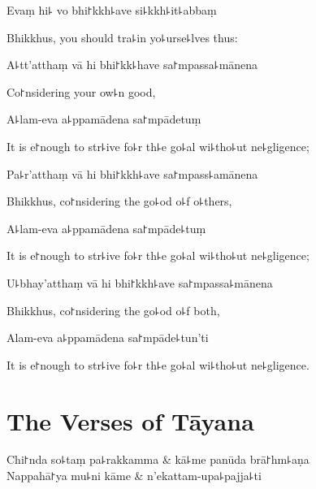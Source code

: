 Evaṃ hi꜕ vo bhi꜓kkh꜕ave si꜕kkh꜕it꜕abbaṃ

\begin{english}
  Bhikkhus, you should tra꜕in yo꜕urse꜕lves thus:
\end{english}

A꜕tt'atthaṃ vā hi bhi꜓kk꜕have sa꜓mpassa꜕mānena

\begin{english}
  Co꜓nsidering your ow꜕n good,
\end{english}

A꜕lam-eva a꜕ppamādena sa꜓mpādetuṃ

\begin{english}
  It is e꜓nough to str꜕ive fo꜕r th꜕e go꜕al wi꜕tho꜕ut ne꜕gligence;
\end{english}

Pa꜕r'atthaṃ vā hi bhi꜓kkh꜕ave sa꜓mpass꜕amānena

\begin{english}
  Bhikkhus, co꜓nsidering the go꜕od o꜕f o꜕thers,
\end{english}

A꜕lam-eva a꜕ppamādena sa꜓mpāde꜕tuṃ

\begin{english}
  It is e꜓nough to str꜕ive fo꜕r th꜕e go꜕al wi꜕tho꜕ut ne꜕gligence;
\end{english}

U꜕bhay'atthaṃ vā hi bhi꜓kkh꜕ave sa꜓mpassa꜕mānena

\begin{english}
  Bhikkhus, co꜓nsidering the go꜕od o꜕f both,
\end{english}

Alam-eva a꜕ppamādena sa꜓mpāde꜕tun'ti

\begin{english}
  It is e꜓nough to str꜕ive fo꜕r th꜕e go꜕al wi꜕tho꜕ut ne꜕gligence.
\end{english}

\chapter{The Verses of Tāyana}%


\begin{leader}
\end{leader}

\begin{twochants}
  Chi꜓nda so꜕taṃ pa꜕rakkamma & kā꜕me panūda brā꜓hm꜕aṇa \\
  Nappahā꜓ya mu꜕ni kāme & n'ekattam-upa꜕pajja꜕ti \\
\end{twochants}

